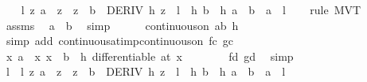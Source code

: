 \begin{isabellebody}
\ \ \isamarkupfalse%
\ {\isachardoublequoteopen}{\isasymexists}l\ z{\isachardot}{\kern0pt}\ a\ {\isacharless}{\kern0pt}\ z\ {\isasymand}\ z\ {\isacharless}{\kern0pt}\ b\ {\isasymand}\ DERIV\ {\isacharquery}{\kern0pt}h\ z\ {\isacharcolon}{\kern0pt}{\isachargreater}{\kern0pt}\ l\ {\isasymand}\ {\isacharquery}{\kern0pt}h\ b\ {\isacharminus}{\kern0pt}\ {\isacharquery}{\kern0pt}h\ a\ {\isacharequal}{\kern0pt}\ {\isacharparenleft}{\kern0pt}b\ {\isacharminus}{\kern0pt}\ a{\isacharparenright}{\kern0pt}\ {\isacharasterisk}{\kern0pt}\ l{\isachardoublequoteclose}\isanewline
\ \ \isamarkupfalse%
\ {\isacharparenleft}{\kern0pt}rule\ MVT{\isacharparenright}{\kern0pt}\isanewline
\ \ \ \ \isamarkupfalse%
\ assms\ \isamarkupfalse%
\ {\isachardoublequoteopen}a\ {\isacharless}{\kern0pt}\ b{\isachardoublequoteclose}\ \isamarkupfalse%
\ simp\isanewline
\ \ \ \ \isamarkupfalse%
\ {\isachardoublequoteopen}continuous{\isacharunderscore}{\kern0pt}on\ {\isacharbraceleft}{\kern0pt}a{\isachardot}{\kern0pt}{\isachardot}{\kern0pt}b{\isacharbraceright}{\kern0pt}\ {\isacharquery}{\kern0pt}h{\isachardoublequoteclose}\isanewline
\ \ \ \ \ \ \isamarkupfalse%
\ {\isacharparenleft}{\kern0pt}simp\ add{\isacharcolon}{\kern0pt}\ continuous{\isacharunderscore}{\kern0pt}at{\isacharunderscore}{\kern0pt}imp{\isacharunderscore}{\kern0pt}continuous{\isacharunderscore}{\kern0pt}on\ fc\ gc{\isacharparenright}{\kern0pt}\isanewline
\ \ \ \ \isamarkupfalse%
\ {\isachardoublequoteopen}{\isasymAnd}x{\isachardot}{\kern0pt}\ {\isasymlbrakk}a\ {\isacharless}{\kern0pt}\ x{\isacharsemicolon}{\kern0pt}\ x\ {\isacharless}{\kern0pt}\ b{\isasymrbrakk}\ {\isasymLongrightarrow}\ {\isacharquery}{\kern0pt}h\ differentiable\ {\isacharparenleft}{\kern0pt}at\ x{\isacharparenright}{\kern0pt}{\isachardoublequoteclose}\isanewline
\ \ \ \ \ \ \isamarkupfalse%
\ fd\ gd\ \isamarkupfalse%
\ simp\isanewline
\ \ \isamarkupfalse%
\isanewline
\ \ \isamarkupfalse%
\ \isamarkupfalse%
\ l\ \ l{\isacharcolon}{\kern0pt}\ {\isachardoublequoteopen}{\isasymexists}z{\isachardot}{\kern0pt}\ a\ {\isacharless}{\kern0pt}\ z\ {\isasymand}\ z\ {\isacharless}{\kern0pt}\ b\ {\isasymand}\ DERIV\ {\isacharquery}{\kern0pt}h\ z\ {\isacharcolon}{\kern0pt}{\isachargreater}{\kern0pt}\ l\ {\isasymand}\ {\isacharquery}{\kern0pt}h\ b\ {\isacharminus}{\kern0pt}\ {\isacharquery}{\kern0pt}h\ a\ {\isacharequal}{\kern0pt}\ {\isacharparenleft}{\kern0pt}b\ {\isacharminus}{\kern0pt}\ a{\isacharparenright}{\kern0pt}\ {\isacharasterisk}{\kern0pt}\ l{\isachardoublequoteclose}\ \isacommand{{\isachardot}{\kern0pt}{\isachardot}{\kern0pt}}\isamarkupfalse%

\end{isabellebody}
